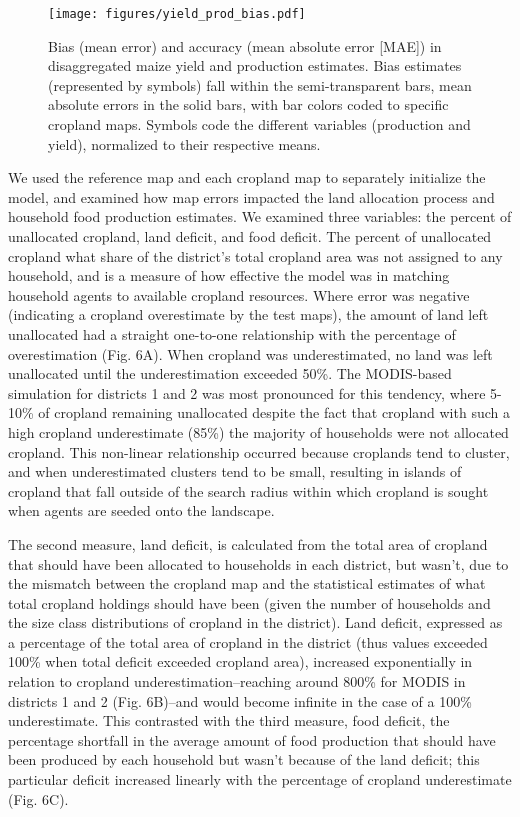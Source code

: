 \documentclass{pnastwo2}
\begin{document}
\begin{article}
\begin{figure}[!hb]
\centerline{\texttt{[image: figures/yield\_prod\_bias.pdf]}}
\caption{Bias (mean error) and accuracy (mean absolute error [MAE]) in disaggregated maize yield and production estimates. Bias estimates (represented by symbols) fall within the semi-transparent bars, mean absolute errors in the solid bars, with bar colors coded to specific cropland maps.  Symbols code the different variables (production and yield), normalized to their respective means.}
\label{afoto}
\end{figure}

We used the reference map and each cropland map to separately initialize the model, and examined how map errors impacted the land allocation process and household food production estimates. We examined three variables: the percent of unallocated cropland, land deficit, and food deficit. The percent of unallocated cropland what share of the district's total cropland area was not assigned to any household, and is a measure of how effective the model was in matching household agents to available cropland resources. Where error was negative (indicating a cropland overestimate by the test maps), the amount of land left unallocated had a straight one-to-one relationship with the percentage of overestimation (Fig. 6A). When cropland was underestimated, no land was left unallocated until the underestimation exceeded 50\%. The MODIS-based simulation for districts 1 and 2 was most pronounced for this tendency, where 5-10\% of cropland remaining unallocated despite the fact that cropland with such a high cropland underestimate (85\%) the majority of households were not allocated cropland. This non-linear relationship occurred because croplands tend to cluster, and when underestimated clusters tend to be small, resulting in islands of cropland that fall outside of the search radius within which cropland is sought when agents are seeded onto the landscape. 

The second measure, land deficit, is calculated from the total area of cropland that should have been allocated to households in each district, but wasn't, due to the mismatch between the cropland map and the statistical estimates of what total cropland holdings should have been (given the number of households and the size class distributions of cropland in the district). Land deficit, expressed as a percentage of the total area of cropland in the district (thus values exceeded 100\% when total deficit exceeded cropland area),  increased exponentially in relation to cropland underestimation--reaching around 800\% for MODIS in districts 1 and 2 (Fig. 6B)--and would become infinite in the case of a 100\% underestimate. This contrasted with the third measure, food deficit, the percentage shortfall in the average amount of food production that should have been produced by each household but wasn't because of the land deficit; this particular deficit increased linearly with the percentage of cropland underestimate (Fig. 6C). 


\end{article}
\end{document}
